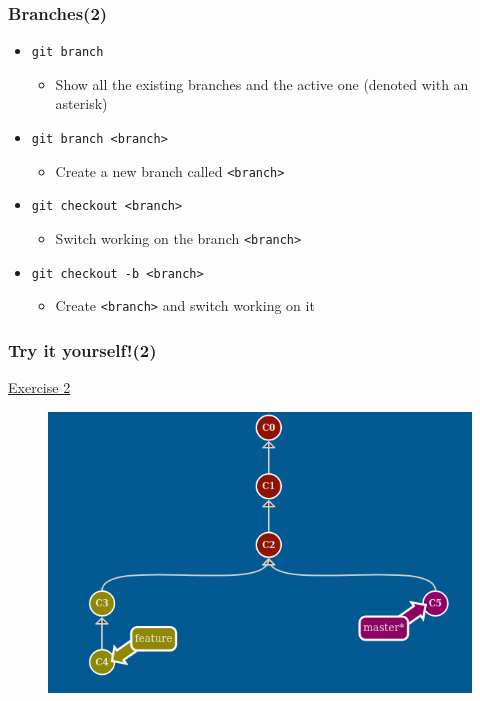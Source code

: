 \documentclass{beamer}
\begin{document}
\begin{frame}
    \frametitle{Branches(2)}
    \begin{itemize}
        \item \texttt{git branch}
        \begin{itemize}
            \item Show all the existing branches and the active one (denoted with an asterisk)
        \end{itemize}
        \item \texttt{git branch <branch>}
        \begin{itemize}
            \item Create a new branch called \texttt{<branch>} 
        \end{itemize}
        \item \texttt{git checkout <branch>}
        \begin{itemize}
            \item Switch working on the branch \texttt{<branch>}
        \end{itemize}
        \item \texttt{git checkout -b <branch>}
        \begin{itemize}
            \item Create \texttt{<branch>} and switch working on it 
        \end{itemize}
    \end{itemize}
\end{frame}


\begin{frame}
    \frametitle{Try it yourself!(2)}
    \begin{center}
        \href{https://learngitbranching.js.org/?NODEMO}{Exercise 2}
    \end{center}
    \begin{figure}
        \includegraphics[scale=0.4]{imgs/ex2.png}
    \end{figure}
\end{frame}
\end{document}
